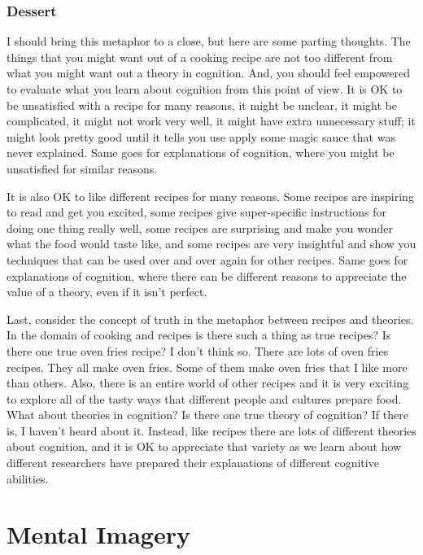 \documentclass[
  oneside,
  12pt]{crumpbook}
\begin{document}
\hypertarget{dessert}{%
\subsection{Dessert}\label{dessert}}

I should bring this metaphor to a close, but here are some parting thoughts. The things that you might want out of a cooking recipe are not too different from what you might want out a theory in cognition. And, you should feel empowered to evaluate what you learn about cognition from this point of view. It is OK to be unsatisfied with a recipe for many reasons, it might be unclear, it might be complicated, it might not work very well, it might have extra unnecessary stuff; it might look pretty good until it tells you use apply some magic sauce that was never explained. Same goes for explanations of cognition, where you might be unsatisfied for similar reasons.

It is also OK to like different recipes for many reasons. Some recipes are inspiring to read and get you excited, some recipes give super-specific instructions for doing one thing really well, some recipes are surprising and make you wonder what the food would taste like, and some recipes are very insightful and show you techniques that can be used over and over again for other recipes. Same goes for explanations of cognition, where there can be different reasons to appreciate the value of a theory, even if it isn't perfect.

Last, consider the concept of truth in the metaphor between recipes and theories. In the domain of cooking and recipes is there such a thing as true recipes? Is there one true oven fries recipe? I don't think so. There are lots of oven fries recipes. They all make oven fries. Some of them make oven fries that I like more than others. Also, there is an entire world of other recipes and it is very exciting to explore all of the tasty ways that different people and cultures prepare food. What about theories in cognition? Is there one true theory of cognition? If there is, I haven't heard about it. Instead, like recipes there are lots of different theories about cognition, and it is OK to appreciate that variety as we learn about how different researchers have prepared their explanations of different cognitive abilities.

\hypertarget{mental-imagery}{%
\chapter{Mental Imagery}\label{mental-imagery}}
\end{document}
